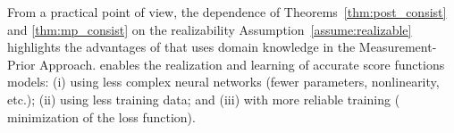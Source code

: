 {From a practical point of view, {the dependence of}
Theorems~\ref{thm:post_consist} and \ref{thm:mp_consist} {on the  realizability Assumption~\ref{assume:realizable}}
highlights the advantages of \peac{} that uses domain knowledge {in the Measurement-Prior Approach.}  \peac{} enables {the realization and learning of accurate score functions models}: (i) using less complex neural networks (fewer parameters, nonlinearity, etc.); (ii)  {using} less training data; and (iii) {with more reliable training %
(%
minimization of the loss function).%
}








 }

 



